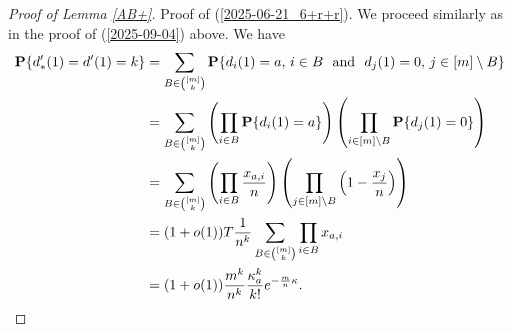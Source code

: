 \documentclass[10pt,a4paper]{amsart}
\newcommand{\PP}{{\bf{P}}}
\begin{document}
\begin{proof}[ Proof of Lemma \ref{AB+}]
Proof of (\ref{2025-06-21_6+r+r}). We proceed similarly as in the proof of (\ref{2025-09-04})
above. We have
\begin{align*}
\PP\{d'_*(1)=d'(1)=k\}
&
=
\sum_{B\in\binom{[m]}{k}}
\PP\{d_i(1)=a,\, i\in B
\
\
{\text{and}}
\
\
d_j(1)=0,
\, j\in [m]\setminus B\}
\\
\nonumber
&
=
\sum_{B\in\binom{[m]}{k}}
\left(
\prod_{i\in B}
\PP\{d_i(1)=a\}
\right)
\left(
\prod_{i\in[m]\setminus B}
\PP\{d_j(1)=0\}
\right)
\\
\nonumber
&=
\sum_{B\in\binom{[m]}{k}}
\left(
\prod_{i\in B}
\frac{x_{a,i}}{n}
\right)
\left(
\prod_{j\in[m]\setminus B}
\left(
1
-
\frac{x_j}{n}
\right)
\right)
\\
\nonumber
&
=
(1+o(1))
T\frac{1}{n^k}
\sum_{B\in\binom{[m]}{k}}
\prod_{i\in B}x_{a,i}
\\
\nonumber
&
=
 (1+o(1))\frac{m^k}{n^k}\frac{\kappa_a^k}{k!}
 e^{-\frac{m}{n}\kappa}.
\end{align*}


\end{proof}
\end{document}
